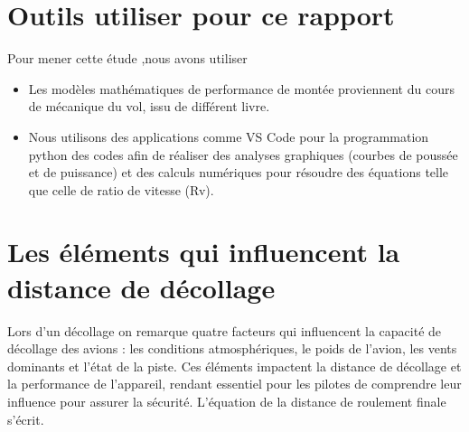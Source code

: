 \section{Outils utiliser pour ce rapport}

	Pour mener cette étude ,nous avons utiliser 
	\begin{itemize}
		\item  Les modèles mathématiques de performance de montée proviennent du cours de mécanique du vol, issu de différent livre.
		\item Nous utilisons des applications comme VS Code pour la programmation python des codes afin de réaliser des analyses graphiques (courbes de poussée et de puissance) et des calculs numériques pour résoudre des équations  telle que celle de ratio de vitesse (Rv).
	\end{itemize}

	

	\vspace{1cm}
	
	
	
	
	
	
	
	
	\section{ Les éléments qui influencent la distance de décollage }
	
	Lors d'un décollage on remarque quatre facteurs qui influencent la capacité de décollage des avions : les conditions atmosphériques, le poids de l'avion, les vents dominants et l'état de la piste. Ces éléments impactent la distance de décollage et la performance de l'appareil, rendant essentiel pour les pilotes de comprendre leur influence pour assurer la sécurité.
	L'équation de la distance de roulement finale s'écrit.
	
	
	
